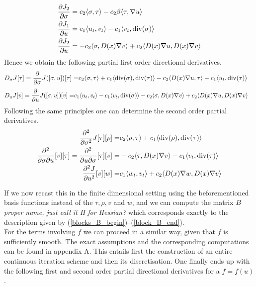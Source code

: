 \documentclass[../draft_1.tex]{subfiles}
\begin{document}
\begin{align}
\frac{\partial J_2}{\partial \sigma} &= c_2 \langle \sigma, \tau \rangle - c_2 \beta \langle \tau, \nabla u \rangle \\
\frac{\partial J_1}{\partial u} &= c_1 \langle u_t, v_t \rangle - c_1 \langle v_t, \mathop{}\!\mathrm{div}(\sigma) \rangle \\
\frac{\partial J_2}{\partial u} &= - c_2 \langle \sigma, D(x) \nabla v \rangle + c_2 \langle D(x) \nabla u, D(x) \nabla v \rangle
\end{align}
Hence we obtain the following partial first order directional derivatives. 
\begin{equation}
\begin{aligned}
D_{\sigma} J [\tau] = \frac{\partial}{\partial \sigma}J([\sigma, u])[\tau] =& c_2 \langle \sigma, \tau \rangle + c_1 \langle \mathop{}\!\mathrm{div}(\sigma), \mathop{}\!\mathrm{div}(\tau) \rangle - c_2 \langle D(x) \nabla u, \tau \rangle - c_1 \langle u_t, \mathop{}\!\mathrm{div}(\tau) \rangle 
\end{aligned}
\end{equation}
\begin{equation}
\begin{aligned}
D_u J [v]= \frac{\partial}{\partial u} J([\sigma, u])[v] =&  c_1 \langle u_t, v_t \rangle - c_1 \langle v_t, \mathop{}\!\mathrm{div}(\sigma) \rangle - c_2 \langle \sigma, D(x) \nabla v \rangle + c_2 \langle D(x) \nabla u, D(x) \nabla v \rangle
\end{aligned}
\end{equation}
Following the same principles one can determine the second order partial derivatives.
\begin{align}
\begin{aligned}
\frac{\partial^2}{\partial \sigma^2} J [\tau] [\rho] =& c_2 \langle \rho, \tau \rangle + c_1 \langle \mathop{}\!\mathrm{div}(\rho), \mathop{}\!\mathrm{div}(\tau) \rangle  \\
\frac{\partial^2}{\partial \sigma \partial u} [v][\tau] = \frac{\partial^2 }{\partial u \partial \sigma} [\tau] [v]=& - c_2 \langle \tau, D(x) \nabla v \rangle - c_1 \langle v_t, \mathop{}\!\mathrm{div}(\tau) \rangle \\
\frac{\partial^2 J}{\partial u^2} [v][w] =& c_1 \langle w_t, v_t \rangle + c_2 \langle D(x) \nabla w, D(x) \nabla v \rangle
\end{aligned}
\end{align}

If we now recast this in the finite dimensional setting using the beforementioned basis functions instead of the $\tau, \rho, v$ and $w$, and we can compute the matrix $B$ \textit{proper name, just call it H for Hessian?} which corresponds exactly to the description given by (\ref{blocks_B_begin})--(\ref{block_B_end}). 
\smallskip
\\
For the terms involving $f$ we can proceed in a similar way, given that $f$ is sufficiently smooth. The exact assumptions and the corresponding computations can be found in appendix A. This entails first the construction of an entire continuous iteration scheme and then its discretisation. One finally ends up with the following first and second order partial directional derivatives for a $f=f(u)$.
\end{document}
